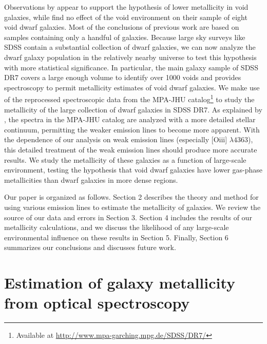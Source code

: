 Observations by \cite{Cooper08, Deng11, Filho15, Pustilnik06, Pustilnik11a, 
Pustilnik11b, Pustilnik13, Pustilnik14} appear to support the hypothesis of 
lower metallicity in void galaxies, while \cite{Kreckel15} find no effect of the 
void environment on their sample of eight void dwarf galaxies.  Most of the 
conclusions of previous work are based on samples containing only a handful of 
galaxies.  Because large sky surveys like SDSS contain a substantial collection 
of dwarf galaxies, we can now analyze the dwarf galaxy population in the 
relatively nearby universe to test this hypothesis with more statistical 
significance.  In particular, the main galaxy sample of SDSS DR7 covers a large 
enough volume to identify over 1000 voids \citep{Pan12} and provides 
spectroscopy to permit metallicity estimates of void dwarf galaxies.  We make 
use of the reprocessed spectroscopic data from the MPA-JHU 
catalog\footnote{Available at \url{http://www.mpa-garching.mpg.de/SDSS/DR7/}} to 
study the metallicity of the large collection of dwarf galaxies in SDSS DR7.  As 
explained by \cite{Tremonti04}, the spectra in the MPA-JHU catalog are analyzed 
with a more detailed stellar continuum, permitting the weaker emission lines to 
become more apparent.  With the dependence of our analysis on weak emission 
lines (especially [O{\sc iii}] $\lambda 4363$), this detailed treatment of the 
weak emission lines should produce more accurate results.  We study the 
metallicity of these galaxies as a function of large-scale environment, testing 
the hypothesis that void dwarf galaxies have lower gas-phase metallicities than 
dwarf galaxies in more dense regions.

Our paper is organized as follows.  Section 2 describes the theory and method 
for using various emission lines to estimate the metallicity of galaxies.  We 
review the source of our data and errors in Section 3.   Section 4 includes the 
results of our metallicity calculations, and we discuss the likelihood of any 
large-scale environmental influence on these results in Section 5.  Finally, 
Section 6 summarizes our conclusions and discusses future work.



\section[Calculating metallicity]{Estimation of galaxy metallicity from optical spectroscopy}
\label{sec:Theory_P1}

